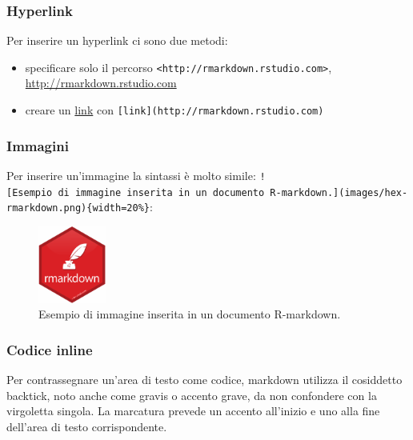 \documentclass[
]{memoir}
\providecommand{\tightlist}{%
  \setlength{\itemsep}{0pt}\setlength{\parskip}{0pt}}
\theoremstyle{definition}
\theoremstyle{definition}
\theoremstyle{definition}
\theoremstyle{definition}
\theoremstyle{remark}
\begin{document}
\hypertarget{hyperlink}{%
\subsubsection{Hyperlink}\label{hyperlink}}

Per inserire un hyperlink ci sono due metodi:

\begin{itemize}
\tightlist
\item
  specificare solo il percorso \texttt{\textless{}http://rmarkdown.rstudio.com\textgreater{}}, \url{http://rmarkdown.rstudio.com}\\
\item
  creare un \href{http://rmarkdown.rstudio.com}{link} con \texttt{{[}link{]}(http://rmarkdown.rstudio.com)}\\
\end{itemize}

\hypertarget{immagini}{%
\subsubsection{Immagini}\label{immagini}}

Per inserire un'immagine la sintassi è molto simile: \texttt{!{[}Esempio\ di\ immagine\ inserita\ in\ un\ documento\ R-markdown.{]}(images/hex-rmarkdown.png)\{width=20\%\}}:

\begin{figure}
\centering
\includegraphics[width=0.2\textwidth,height=\textheight]{images/hex-rmarkdown.png}
\caption{Esempio di immagine inserita in un documento R-markdown.}
\end{figure}

\hypertarget{codice-inline}{%
\subsubsection{Codice inline}\label{codice-inline}}

Per contrassegnare un'area di testo come codice, markdown utilizza il cosiddetto backtick, noto anche come gravis o accento grave, da non confondere con la virgoletta singola. La marcatura prevede un accento all'inizio e uno alla fine dell'area di testo corrispondente.
\end{document}
